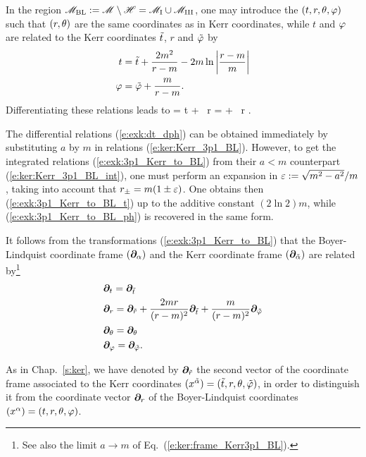 In the region $\mathscr{M}_{\rm BL}:= \mathscr{M} \setminus \mathscr{H} = \mathscr{M}_{\rm I} \cup \mathscr{M}_{\rm III}$, one may introduce
the 
$(t,r,\theta,\varphi)$ such that $(r,\theta)$ are the same coordinates as in
Kerr coordinates, while $t$ and $\varphi$ are related to the Kerr coordinates
${\tilde t}$, $r$ and ${\tilde\varphi}$ by
\begin{subequations}
\label{e:exk:3p1_Kerr_to_BL}
\begin{align}
    t & = {\tilde t} +  \frac{2m^2}{r - m} - 2m \ln \left| \frac{r - m}{m} \right|
            \label{e:exk:3p1_Kerr_to_BL_t} \\
    \varphi & = {\tilde\varphi} + \frac{m}{r - m} . \label{e:exk:3p1_Kerr_to_BL_ph}
\end{align}
\end{subequations}
Differentiating these relations leads to
\be \label{e:exk:dt_dph}
    \dd \ti = \dd t  +  \, \dd r
    \qand
    \dd \tph = \dd \ph +  \, \dd r .
\ee
\begin{remark}
The differential relations (\ref{e:exk:dt_dph}) can be obtained immediately
by substituting $a$ by $m$ in relations (\ref{e:ker:Kerr_3p1_BL}). However, to get the integrated
relations (\ref{e:exk:3p1_Kerr_to_BL}) from their $a<m$ counterpart
(\ref{e:ker:Kerr_3p1_BL_int}), one must perform an expansion in $\varepsilon := \sqrt{m^2 - a^2}/m$,
taking into account that $r_\pm = m(1\pm\varepsilon)$. One obtains then
(\ref{e:exk:3p1_Kerr_to_BL_t})
up to the additive constant $(2\ln 2) m$, while (\ref{e:exk:3p1_Kerr_to_BL_ph}) is recovered in the same form.
\end{remark}
It follows from the transformations (\ref{e:exk:3p1_Kerr_to_BL}) that
the Boyer-Lindquist coordinate frame $(\bm{\partial}_\alpha)$ and the Kerr coordinate frame $(\bm{\partial}_{\tilde{\alpha}})$ are related by\footnote{See also the limit $a\to m$ of Eq.~(\ref{e:ker:frame_Kerr3p1_BL}).}
\begin{subequations}
\label{e:exk:frame_BL_Kerr3p1}
\begin{align}
    & \bm{\partial}_t  = \bm{\partial}_{\tilde t}  \\
    & \bm{\partial}_r = \bm{\partial}_{\tilde r} + \frac{2mr}{(r-m)^2} \bm{\partial}_{\tilde t}
                        + \frac{m}{(r-m)^2} \bm{\partial}_{\tilde\varphi} \\
    & \bm{\partial}_\theta = \bm{\partial}_\theta \\
    & \bm{\partial}_\varphi = \bm{\partial}_{{\tilde\varphi}} .
\end{align}
\end{subequations}

\begin{remark}
As in Chap.~\ref{s:ker}, we have denoted by $\bm{\partial}_{\tilde r}$ the second vector of the
coordinate frame associated to the Kerr coordinates
$(x^{\tilde{\alpha}}) = ({\tilde t}, r, \theta,{\tilde\varphi})$, in order to distinguish it from
the coordinate vector
$\bm{\partial}_r$ of the Boyer-Lindquist coordinates
$(x^\alpha) = (t,r,\theta,\varphi)$.
\end{remark}

